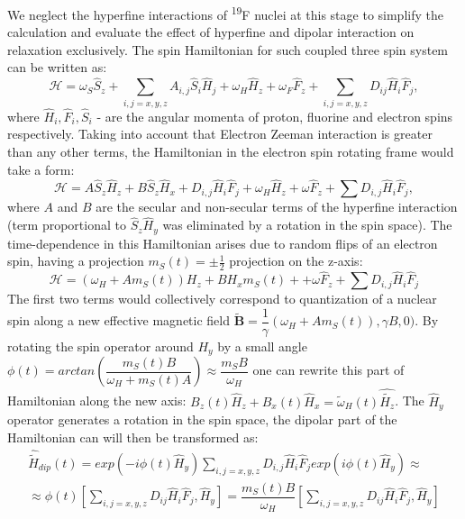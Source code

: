 \documentclass[a4paper, 12pt]{article}
\begin{document}
We neglect the hyperfine interactions of \textsuperscript{19}F nuclei at this stage to simplify the calculation and evaluate the effect of hyperfine and dipolar interaction on relaxation exclusively. The spin Hamiltonian for such coupled three spin system can be written as: 
\begin{equation}
\mathcal{H} =  \omega_S \hat{S}_z + \sum_{i,j=x,y,z} A_{i,j} \hat{S}_i \hat{H}_j + \omega_H \hat{H}_z + \omega_F \hat{F}_z + \sum_{i,j=x,y,z} D_{ij} \hat{H}_i \hat{F}_j,
\end{equation}
where $\hat{H}_i, \hat{F}_i, \hat{S}_i$ - are the angular momenta of proton, fluorine and electron spins respectively. Taking into account that Electron Zeeman interaction is greater than any other terms, the Hamiltonian in the electron spin rotating frame would take a form:
\begin{equation}
\mathcal{H}  = A \hat{S}_z \hat{H}_z + B \hat{S}_z \hat{H}_x + D_{i,j} \hat{H}_i \hat{F}_j +  \omega_H \hat{H}_z + \omega \hat{F}_z + \sum D_{i,j} \hat{H}_i \hat{F}_j,
\end{equation}
where $A$ and $B$ are the secular and non-secular terms of the hyperfine interaction (term proportional to $\hat{S}_z \hat{H}_y$ was eliminated by a rotation in the spin space). The time-dependence in this Hamiltonian arises due to random flips of an electron spin, having a projection $m_S(t)=\pm \frac{1}{2}$ projection on the z-axis:
\begin{equation}
\mathcal{H} = (\omega_H + A m_S(t)) H_z + B H_x m_S(t) + + \omega \hat{F}_z + \sum D_{i,j} \hat{H}_i \hat{F}_j
\end{equation}
The first two terms would collectively correspond to quantization of a nuclear spin along a new effective magnetic field $\tilde{\mathbf{B}}=\dfrac{1}{\gamma}(\omega_H + A m_S(t)), \gamma B, 0)$. By rotating the spin operator around $H_y$ by a small angle $\phi(t)= arctan(\dfrac{m_S(t)B}{\omega_H + m_S(t) A} )  \approx \dfrac{m_S B}{\omega_H}$ one can rewrite this part of Hamiltonian along the new axis: $B_z(t) \hat{H}_z + B_x(t) \hat{H}_x = \tilde{\omega}_H(t) \hat{\tilde{H_z}}$. The $\hat{H}_y$ operator generates a rotation in the spin space, the dipolar part of the Hamiltonian can will then be transformed as:
\begin{equation}
\begin{array}{cc}
\hat{\tilde{H}}_{dip} (t) =  exp(-i \phi(t) \hat{H}_y) \sum\limits_{i,j=x,y,z} D_{i,j} \hat{H}_i \hat{F}_j exp(i \phi(t) \hat{H}_y)  \approx  \\
\approx \phi(t)[ \sum \limits_{i,j=x,y,z} D_{ij} \hat{H}_i \hat{F}_j, \hat{H}_y] = \dfrac{m_S(t) B}{\omega_H} [ \sum \limits_{i,j=x,y,z} D_{ij} \hat{H}_i \hat{F}_j, \hat{H}_y]
\end{array}
\end{equation}
\end{document}
